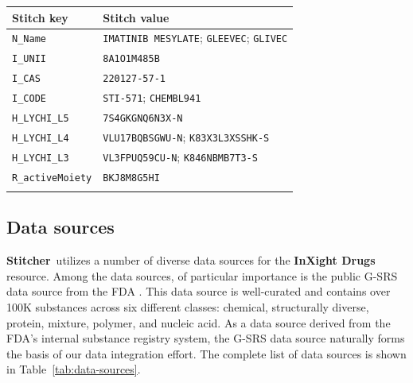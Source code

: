 \documentclass{bioinfo}
\newcommand\st{\textbf{Stitcher}}
\newcommand\ix{\textbf{InXight Drugs}}
\begin{document}
\begin{table}[thb]
{\begin{tabular}{@{}ll@{}}\toprule Stitch key &
Stitch value\\\midrule
\texttt{N\_Name} & \texttt{IMATINIB MESYLATE}; \texttt{GLEEVEC}; \texttt{GLIVEC}\\
\texttt{I\_UNII} & \texttt{8A1O1M485B}\\
\texttt{I\_CAS} & \texttt{220127-57-1}\\
\texttt{I\_CODE} & \texttt{STI-571}; \texttt{CHEMBL941}\\
\texttt{H\_LYCHI\_L5} & \texttt{7S4GKGNQ6N3X-N}\\
\texttt{H\_LYCHI\_L4} & \texttt{VLU17BQBSGWU-N}; \texttt{K83X3L3XSSHK-S}\\
\texttt{H\_LYCHI\_L3} & \texttt{VL3FPUQ59CU-N}; \texttt{K846NBMB7T3-S}\\
\texttt{R\_activeMoiety} & \texttt{BKJ8M8G5HI}\\\botrule
\end{tabular}}{}
\end{table}

\subsection{Data sources}
\st\ utilizes a number of diverse data sources for the \ix{} resource. Among the data sources, of particular importance is the public G-SRS data source from the FDA \citep{GSRSData}. This data source is well-curated and contains over 100K substances across six different classes: chemical, structurally diverse, protein, mixture, polymer, and nucleic acid. As a data source derived from the FDA's internal substance registry system, the G-SRS data source naturally forms the basis of our data integration effort. The complete list of data sources is shown in Table~\ref{tab:data-sources}.
\end{document}
